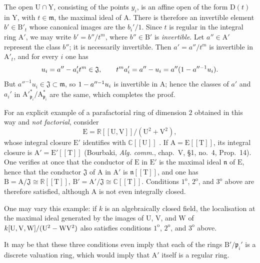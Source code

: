 \begin{env}[21.13.9]
The open $\mathrm{U}\cap\mathrm{Y}$, consisting of the points $y_i$, is an affine open of the form $\mathrm{D}(t)$ in $\mathrm{Y}$, with $t\in\mathfrak{m}$, the maximal ideal of $\mathrm{A}$. There is therefore an invertible element $b'\in\mathrm{B}'_t$ whose canonical images are the $b_i'/1$. Since $t$ is regular in the integral ring $\mathrm{A}'$, we may write $b'=b''/t^m$, where $b''\in\mathrm{B}'$ is \emph{invertible}. Let $a''\in\mathrm{A}'$ represent the class $b''$; it is necessarily invertible. Then $a'=a''/t^m$ is invertible in $\mathrm{A}'_t$, and for every $i$ one has
\[
  u_i=a''- a_i't^m\in\mathfrak{J},
  \qquad
  t^m a_i'=a''- u_i=a''(1- a''^{-1}u_i).
\]
But $a''^{-1}u_i\in\mathfrak{J}\subset\mathfrak{m}$, so $1- a''^{-1}u_i$ is invertible in $\mathrm{A}$; hence the classes of $a'$ and $a_i'$ in $\mathrm{A}'^*_{\mathfrak{p}_i}/\mathrm{A}^*_{\mathfrak{p}_i}$ are the same, which completes the proof.

For an explicit example of a parafactorial ring of dimension $2$ obtained in this way and \emph{not factorial}, consider
\[
  \mathrm{E}=\mathbb{R}[[\mathrm{U},\mathrm{V}]]/(\mathrm{U}^2+\mathrm{V}^2),
\]
whose integral closure $\mathrm{E}'$ identifies with $\mathbb{C}[[\mathrm{U}]]$ . If $\mathrm{A}=\mathrm{E}[[\mathrm{T}]]$, its integral closure is $\mathrm{A}'=\mathrm{E}'[[\mathrm{T}]]$ (Bourbaki, \emph{Alg. comm.}, chap.~V, \S1, no.~4, Prop.~14). One verifies at once that the conductor of $\mathrm{E}$ in $\mathrm{E}'$ is the maximal ideal $\mathfrak{n}$ of $\mathrm{E}$, hence that the conductor $\mathfrak{J}$ of $\mathrm{A}$ in $\mathrm{A}'$ is $\mathfrak{n}[[\mathrm{T}]]$, and one has $\mathrm{B}=\mathrm{A}/\mathfrak{J}\cong\mathbb{R}[[\mathrm{T}]]$, $\mathrm{B}'=\mathrm{A}'/\mathfrak{J}\cong\mathbb{C}[[\mathrm{T}]]$. Conditions $1^{\mathrm{o}}$, $2^{\mathrm{o}}$, and $3^{\mathrm{o}}$ above are therefore satisfied, although $\mathrm{A}$ is not even integrally closed.

One may vary this example: if $k$ is an algebraically closed field, the localisation at the maximal ideal generated by the images of $\mathrm{U}$, $\mathrm{V}$, and $\mathrm{W}$ of $k[\mathrm{U},\mathrm{V},\mathrm{W}]/(\mathrm{U}^2-\mathrm{W}\mathrm{V}^2)$
also satisfies conditions $1^{\mathrm{o}}$, $2^{\mathrm{o}}$, and $3^{\mathrm{o}}$ above.

It may be that these three conditions even imply that each of the rings $\mathrm{B}'/\mathfrak{p}_i'$ is a discrete valuation ring, which would imply that $\mathrm{A}'$ itself is a regular ring.
\end{env}

